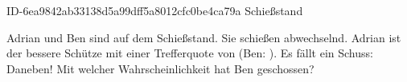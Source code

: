 \begin{exercise}
      {ID-6ea9842ab33138d5a99dff5a8012cfc0be4ca79a}
      {Schießstand}
  \ifproblem\problem\par
    Adrian und Ben sind auf dem Schießstand. Sie schießen abwechselnd. Adrian
    ist der bessere Schütze mit einer Trefferquote von  (Ben: ).
    Es fällt ein Schuss: Daneben! Mit welcher Wahrscheinlichkeit hat Ben
    geschossen?
  \fi
\end{exercise}
